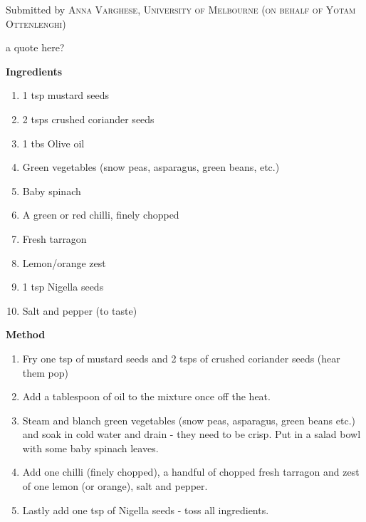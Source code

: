 

Submitted by \textsc{Anna Varghese, University of Melbourne (on behalf of \textsc{Yotam Ottenlenghi})}


\begin{shadequote*}
a quote here?
\end{shadequote*}
\hrulefill

\textbf{Ingredients}

\begin{enumerate}[before=\itshape,font=\normalfont]
\item 1 tsp mustard seeds
\item 2 tsps crushed coriander seeds
\item 1 tbs Olive oil
\item Green vegetables (snow peas, asparagus, green beans, etc.)
\item Baby spinach
\item A green or red chilli, finely chopped
\item Fresh tarragon
\item Lemon\slash orange zest
\item 1 tsp Nigella seeds
\item Salt and pepper (to taste)
\end{enumerate}

\hrulefill

\textbf{Method}

\begin{enumerate}
\item Fry one tsp of mustard seeds and 2 tsps of crushed coriander seeds (hear them pop) 
\item Add a tablespoon of oil to the mixture once off the heat. 
\item Steam and blanch green vegetables (snow peas, asparagus, green beans etc.) and soak in cold water and drain - they need to be crisp. Put in a salad bowl with some baby spinach leaves.  
\item Add one chilli (finely chopped), a handful of chopped fresh tarragon and zest of one lemon (or orange), salt and pepper. 
\item Lastly add one tsp of Nigella seeds - toss all ingredients. 
\end{enumerate}




\vfill
\pagebreak



